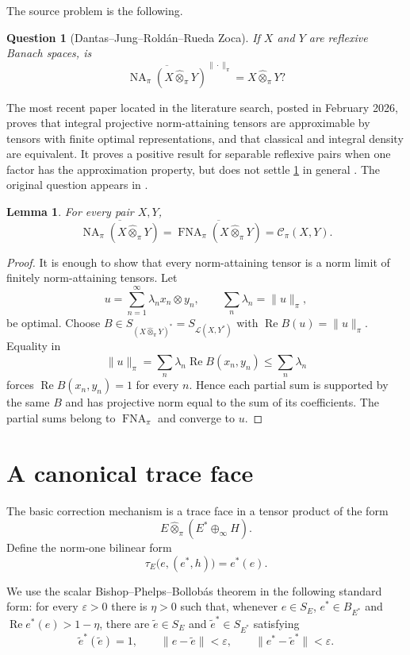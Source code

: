 \documentclass[11pt]{article}
\newtheorem{lemma}[lemma]{Lemma}
\newtheorem{question}[question]{Question}
\theoremstyle{definition}
\theoremstyle{remark}
\newcommand{\whot}{\widehat\otimes_\pi}
\newcommand{\NA}{\operatorname{NA}_\pi}
\newcommand{\FNA}{\operatorname{FNA}_\pi}
\newcommand{\Lin}{\mathcal L}
\newcommand{\Rea}{\operatorname{Re}}
\newcommand{\Cpi}{\mathscr C_\pi}
\newcommand{\cl}{\overline}
\begin{document}
The source problem is the following.

\begin{question}[Dantas--Jung--Rold\'an--Rueda Zoca]\label{q:main}
If $X$ and $Y$ are reflexive Banach spaces, is
\[
 \cl{\NA(X\whot Y)}^{\|\cdot\|_\pi}=X\whot Y?
\]
\end{question}

The most recent paper located in the literature search, posted in February 2026, proves that integral projective norm-attaining tensors are approximable by tensors with finite optimal representations, and that classical and integral density are equivalent.  It proves a positive result for separable reflexive pairs when one factor has the approximation property, but does not settle \cref{q:main} in general \cite{AliagaEtAl2026}.  The original question appears in \cite[Question 6.1]{DantasEtAl2022}.

\begin{lemma}\label{lem:closures}
For every pair $X,Y$,
\[
 \cl{\NA(X\whot Y)}=\cl{\FNA(X\whot Y)}=\Cpi(X,Y).
\]
\end{lemma}

\begin{proof}
It is enough to show that every norm-attaining tensor is a norm limit of finitely norm-attaining tensors.  Let
\[
 u=\sum_{n=1}^\infty\lambda_nx_n\otimes y_n,
 \qquad \sum_n\lambda_n=\|u\|_\pi,
\]
be optimal.  Choose $B\in S_{(X\whot Y)^*}=S_{\Lin(X,Y^*)}$ with $\Rea B(u)=\|u\|_\pi$.  Equality in
\[
 \|u\|_\pi
 =\sum_n\lambda_n\Rea B(x_n,y_n)
 \leq \sum_n\lambda_n
\]
forces $\Rea B(x_n,y_n)=1$ for every $n$.  Hence each partial sum is supported by the same $B$ and has projective norm equal to the sum of its coefficients.  The partial sums belong to $\FNA$ and converge to $u$.
\end{proof}

\section{A canonical trace face}

The basic correction mechanism is a trace face in a tensor product of the form
\[
 E\whot(E^*\oplus_\infty H).
\]
Define the norm-one bilinear form
\[
 \tau_E\bigl(e,(e^*,h)\bigr)=e^*(e).
\]

We use the scalar Bishop--Phelps--Bollob\'as theorem in the following standard form: for every $\varepsilon>0$ there is $\eta>0$ such that, whenever $e\in S_E$, $e^*\in B_{E^*}$ and $\Rea e^*(e)>1-\eta$, there are $\widetilde e\in S_E$ and $\widetilde e^*\in S_{E^*}$ satisfying
\[
 \widetilde e^*(\widetilde e)=1,
 \qquad
 \|e-\widetilde e\|<\varepsilon,
 \qquad
 \|e^*-\widetilde e^*\|<\varepsilon.
\]
\end{document}
